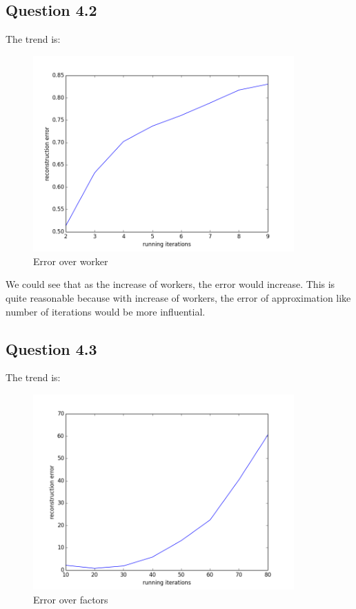 \documentclass{article} %
\begin{document}
\subsection{Question 4.2}
The trend is:
\begin{figure}[h]
\begin{center}
\includegraphics[width=10cm]{pic/q42.png}
\end{center}
\caption{Error over worker}
\end{figure}

We could see that as the increase of workers, the error would increase. This is
quite reasonable because with increase of workers, the error of approximation
like number of iterations would be more influential.

\subsection{Question 4.3}
The trend is:
\begin{figure}[h]
\begin{center}
\includegraphics[width=10cm]{pic/q43.png}
\end{center}
\caption{Error over factors}
\end{figure}
\end{document}
